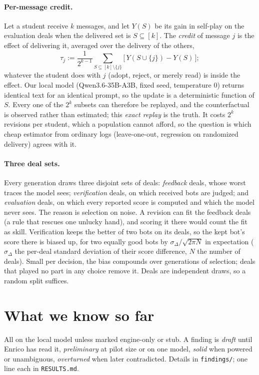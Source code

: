 \documentclass[11pt]{article}
\numberwithin{theorem}{section}
\theoremstyle{definition}
\begin{document}
\paragraph{Per-message credit.} Let a student receive $k$ messages, and let $Y(S)$ be its gain in self-play on the
evaluation deals when the delivered set is $S\subseteq[k]$. The \emph{credit} of message $j$ is the effect of delivering
it, averaged over the delivery of the others,
\[
\tau_j := \frac{1}{2^{k-1}}\sum_{S\subseteq[k]\setminus\{j\}}\big[\,Y(S\cup\{j\}) - Y(S)\,\big];
\]
whatever the student does with $j$ (adopt, reject, or merely read) is inside the effect. Our local model
(Qwen3.6-35B-A3B, fixed seed, temperature $0$) returns identical text for an identical prompt, so the update is a
deterministic function of $S$. Every one of the $2^k$ subsets can therefore be replayed, and the counterfactual is
observed rather than estimated; this \emph{exact replay} is the truth. It costs $2^k$ revisions per student, which a
population cannot afford, so the
question is which cheap estimator from ordinary logs (leave-one-out, regression on randomized delivery) agrees with it.

\paragraph{Three deal sets.} Every generation draws three disjoint sets of deals: \emph{feedback} deals, whose worst
traces the model sees; \emph{verification} deals, on which received bots are judged; and \emph{evaluation} deals, on
which every reported score is computed and which the model never sees. The reason is selection on noise. A revision
can fit the feedback deals (a rule that rescues one unlucky hand), and scoring it there would count the fit as skill.
Verification keeps the better of two bots on its deals, so the kept bot's score there is biased up, for two equally
good bots by $\sigma_\Delta/\sqrt{2\pi N}$ in expectation ($\sigma_\Delta$ the per-deal standard deviation of their
score difference, $N$ the number of deals). Small per decision, the bias compounds over generations of selection;
deals that played no part in any choice remove it. Deals are independent draws, so a random split suffices.

\section{What we know so far}\label{sec:known}

All on the local model unless marked engine-only or stub. A finding is \emph{draft} until Enrico has read it,
\emph{preliminary} at pilot size or on one model, \emph{solid} when powered or unambiguous, \emph{overturned} when later
contradicted. Details in \texttt{findings/}; one line each in \texttt{RESULTS.md}.
\end{document}
